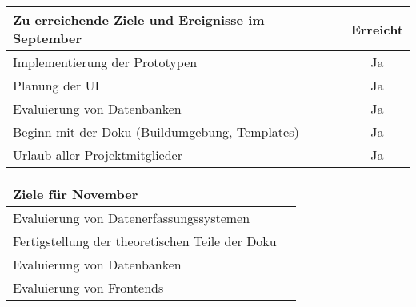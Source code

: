 \begin{tabularx}{\textwidth}{Xc}
    \arrayrulecolor{OliveGreen}
    \toprule
    {\bfseries Zu erreichende Ziele und Ereignisse im September}        & {\bfseries Erreicht} \\
    \midrule[2pt]
    Implementierung der Prototypen                       &Ja                    \\
    \rowcolor{OliveGreen!15}
    Planung der UI                                       &Ja                    \\
    \rowcolor{White}
    Evaluierung von Datenbanken                          &Ja                    \\
    \rowcolor{OliveGreen!15}
    Beginn mit der Doku (Buildumgebung, Templates)       &Ja                    \\
    \rowcolor{White}
    Urlaub aller Projektmitglieder                       &Ja                    \\
    \bottomrule[2pt]
\end{tabularx}
%
\vspace{1cm}
%
\begin{tabularx}{\textwidth}{Xc}
    \arrayrulecolor{OliveGreen}
    \toprule
    {\bfseries Ziele für November}                       &                      \\
    \midrule[2pt]
    Evaluierung von Datenerfassungssystemen              &                      \\
    \rowcolor{OliveGreen!15}
    Fertigstellung der theoretischen Teile der Doku      &                      \\
    \rowcolor{White}
    Evaluierung von Datenbanken                          &                      \\
    \rowcolor{OliveGreen!15}
    Evaluierung von Frontends                            &                      \\
\end{tabularx}
